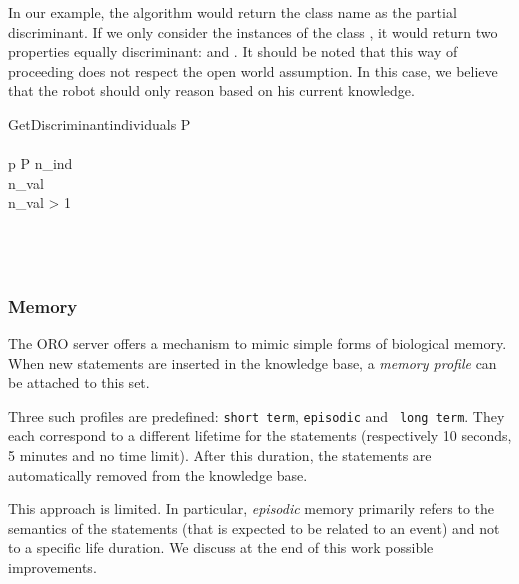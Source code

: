 In our example, the algorithm would return the class name as the partial
discriminant. If we only consider the instances of the class ,
it would return two properties equally discriminant:  and
. It should be noted that this way of proceeding does not respect
the open world assumption. In this case, we believe that the robot should only
reason based on his current knowledge.

\small
\begin{pseudocode}[ruled]{GetDiscriminant}{individuals}
\label{algo|discriminant}
\BEGIN
P \GETS {} \\
 \GETS \emptyset \\
\FOREACH p \in P \DO
    \BEGIN
        n_{ind} \GETS {} \\
        n_{val} \GETS {} \\
        \IF n_{val} > 1 \THEN
             \GETS {} \\
    \END \\

 \\
 \\
\END

\end{pseudocode}
\normalsize


\subsubsection{Memory}
\label{sect|oroserver-memory}

The ORO server offers a mechanism to mimic simple forms of biological memory.
When new statements are inserted in the knowledge base, a \emph{memory profile}
can be attached to this set.

Three such profiles are predefined: {\tt short term}, {\tt episodic} and {\tt
long term}. They each correspond to a different lifetime for the statements
(respectively 10 seconds, 5 minutes and no time limit). After this duration,
the statements are automatically removed from the knowledge base.

This approach is limited. In particular, \emph{episodic} memory primarily refers
to the semantics of the statements (that is expected to be related to an event)
and not to a specific life duration. We discuss at the end of this work possible
improvements.

